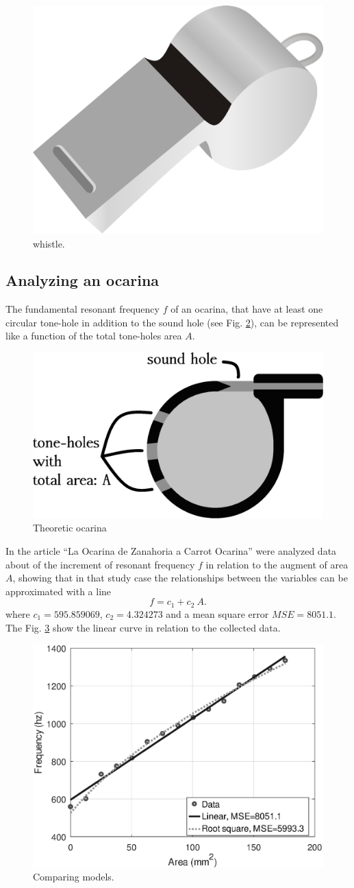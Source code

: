 \documentclass[11pt,twocolumn]{article}
\begin{document}
\begin{figure}[ht!]
\centering
\includegraphics[width=0.250\columnwidth]{football-referee-whistle.eps}
\caption{whistle. }
\label{football-referee-whistle}
\end{figure}

\subsection{Analyzing an ocarina}

The fundamental resonant frequency $f$ of an ocarina, 
that have at least one circular tone-hole %
in addition to the sound hole (see Fig. \ref{fig:ocarina-teorica}),
can be represented like a function of the total tone-holes area $A$.


\begin{figure}[ht!]
\centering
\includegraphics[width=0.750\columnwidth]{ocarina-teorica.eps}
\caption{Theoretic ocarina}
\label{fig:ocarina-teorica}
\end{figure}

In the article ``La Ocarina de Zanahoria a Carrot Ocarina'' \cite{mp2010ocarina}
were analyzed data about of the increment of resonant frequency $f$ in relation to the augment of area $A$,
showing that in that study case the relationships between the variables can be approximated with a line 
\begin{equation}
f=c_1+ c_2~A.
\end{equation}
where $c_1=595.859069$, $c_2=4.324273$ and a mean square error $MSE=8051.1$.
The Fig. \ref{fig:models} show the linear curve in relation to the collected data.


\begin{figure}[ht!]
\centering
\includegraphics[width=0.50\columnwidth]{compara.eps}
\caption{Comparing models. }
\label{fig:models}
\end{figure}
\end{document}
